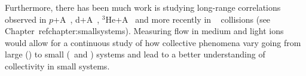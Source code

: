 Furthermore, there has been much work is studying long-range correlations
  observed in $p$+A~\cite{HION-2016-01,CMS:2012qk,Abelev:2012ola,HION-2012-13,HION-2013-04},
  d+A~\cite{Aidala:2017pup}, $^{3}\mathrm{He}$+A~\cite{Adare:2015ctn} 
  and more recently in \pp~\cite{HION-2015-09,HION-2016-01} collisions 
  (see Chapter~ref{chapter:smallsystems}).
Measuring flow in medium and light ions would allow for a continuous study 
  of how collective phenomena vary going from large (\pbpb) to small 
  (\pA\ and \pp) systems and lead to a better understanding of collectivity
  in small systems.


